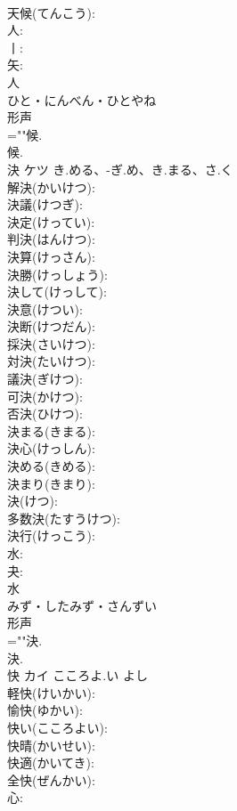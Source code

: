 \documentclass[8pt]{extreport}
\begin{document}
\begin{CJK}{UTF8}{min}
\\	天候(てんこう): 
\\	人: 
\\	丨: 
\\	矢: 
\\	人	
\\	ひと・にんべん・ひとやね	
\\	形声 
\\	=""候.
\\	候.
\\	決	ケツ	き.める、-ぎ.め、き.まる、さ.く		
\\	解決(かいけつ): 
\\	決議(けつぎ): 
\\	決定(けってい): 
\\	判決(はんけつ): 
\\	決算(けっさん): 
\\	決勝(けっしょう): 
\\	決して(けっして): 
\\	決意(けつい): 
\\	決断(けつだん): 
\\	採決(さいけつ): 
\\	対決(たいけつ): 
\\	議決(ぎけつ): 
\\	可決(かけつ): 
\\	否決(ひけつ): 
\\	決まる(きまる): 
\\	決心(けっしん): 
\\	決める(きめる): 
\\	決まり(きまり): 
\\	決(けつ): 
\\	多数決(たすうけつ): 
\\	決行(けっこう): 
\\	水: 
\\	夬: 
\\	水	
\\	みず・したみず・さんずい	
\\	形声 
\\	=""決.
\\	決.
\\	快	カイ	こころよ.い	よし	
\\	軽快(けいかい): 
\\	愉快(ゆかい): 
\\	快い(こころよい): 
\\	快晴(かいせい): 
\\	快適(かいてき): 
\\	全快(ぜんかい): 
\\	心: 

\end{CJK}
\end{document}
